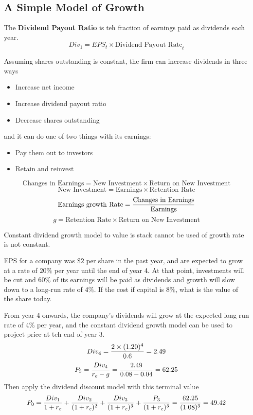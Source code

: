 \documentclass[english, 12pt]{article}
\begin{document}
\subsection{A Simple Model of Growth}

\begin{defn}
The \textbf{Dividend Payout Ratio} is teh fraction of earnings paid as dividends each year.
\[Div_1 = EPS_t \times \text{Dividend Payout Rate}_t\]
\end{defn}

\begin{note}
Assuming shares outstanding is constant, the firm can increase dividends in three ways
\begin{itemize}
\item Increase net income
\item Increase dividend payout ratio
\item Decrease shares outstanding
\end{itemize}
and it can do one of two things with its earnings:
\begin{itemize}
\item Pay them out to investors
\item Retain and reinvest
\end{itemize}
\[\text{Changes in Earnings} = \text{New Investment} \times \text{Return on New Investment}\]
\[\text{New Investment} = \text{Earnings} \times \text{Retention Rate}\]
\[\text{Earnings growth Rate} = \frac{\text{Changes in Earnings}}{\text{Earnings}}\]
\[g = \text{Retention Rate} \times \text{Return on New Investment}\]
\end{note}

\begin{qte}
Constant dividend growth model to value is stack cannot be used of growth rate is not constant.
\end{qte}


\begin{exmp}
EPS for a company was $\$2$ per share in the past year, and are expected to grow at a rate of $20\%$ per year until the end of year 4. At that point, investments will be cut and $60\%$ of its earnings will be paid as dividends and growth will slow down to a long-run rate of $4\%$. If the cost if capital is $8\%$, what is the value of the share today.

\begin{sol}
From year 4 onwards, the company's dividends will grow at the expected long-run rate of $4\%$ per year, and the constant dividend growth model can be used to project price at teh end of year 3.
\[Div_4 = \frac{2 \times (1.20)^4}{0.6} = 2.49\]
\[P_3 = \frac{Div_4}{r_e - g} = \frac{2.49}{0.08-0.04} = 62.25\]
Then apply the dividend discount model with this terminal value
\[P_0 = \frac{Div_1}{1+r_e} + \frac{Div_2}{(1+r_e)^2} + \frac{Div_3}{(1+r_e)^3} + \frac{P_3}{(1+r_e)^3} = \frac{62.25}{(1.08)^3} = 49.42\]
\end{sol}
\end{exmp}
\end{document}

